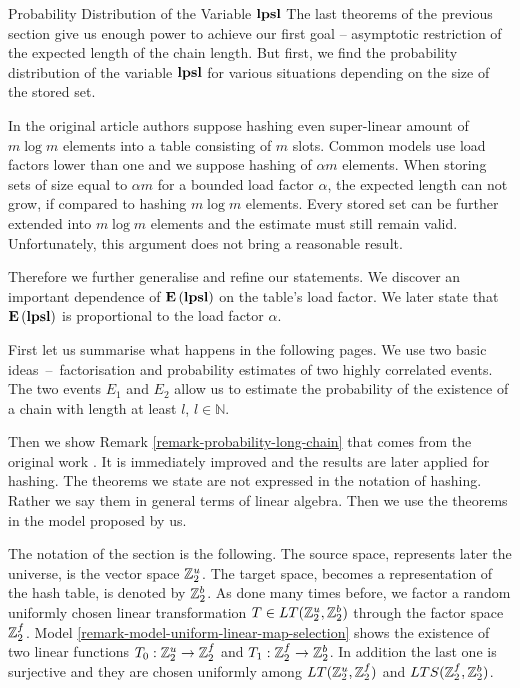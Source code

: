 \begin{section}{Probability Distribution of the Variable \texorpdfstring{$\mathbf{lpsl}$}{lpsl}}
\label{section-linear-transformations-distribution}
The last theorems of the previous section give us enough power to achieve our first goal -- asymptotic restriction of the expected length of the chain length. But first, we find the probability distribution of the variable $\mathbf{lpsl}$ for various situations depending on the size of the stored set. 

In the original article \cite{DBLP:journals/jacm/AlonDMPT99} authors suppose hashing even super-linear amount of $m \log m$ elements into a table consisting of $m$ slots. Common models use load factors lower than one and we suppose hashing of $\alpha m$ elements. When storing sets of size equal to $\alpha m$ for a bounded load factor $\alpha$, the expected length can not grow, if compared to hashing $m \log m$ elements. Every stored set can be further extended into $m \log m$ elements and the estimate must still remain valid. Unfortunately, this argument does not bring a reasonable result.

Therefore we further generalise and refine our statements. We discover an important dependence of $\mathbf{E}\left(\mathbf{lpsl}\right)$ on the table's load factor. We later state that $\mathbf{E}\left(\mathbf{lpsl}\right)$ is proportional to the load factor $\alpha$.

First let us summarise what happens in the following pages. We use two basic ideas~--~factorisation and probability estimates of two highly correlated events. The two events $E_1$ and $E_2$ allow us to estimate the probability of the existence of a chain with length at least $l$, $l \in \mathbb{N}$. 

Then we show Remark \ref{remark-probability-long-chain} that comes from the original work \cite{DBLP:journals/jacm/AlonDMPT99}. It is immediately improved and the results are later applied for hashing. The theorems we state are not expressed in the notation of hashing. Rather we say them in general terms of linear algebra. Then we use the theorems in the model proposed by us. 

The notation of the section is the following. The source space, represents later the universe, is the vector space $\mathbb{Z}_{2}^{u}$. The target space, becomes a representation of the hash table, is denoted by $\mathbb{Z}_{2}^{b}$. As done many times before, we factor a random uniformly chosen linear transformation $T \in LT(\mathbb{Z}_{2}^{u}, \mathbb{Z}_{2}^{b})$ through the factor space $\mathbb{Z}_{2}^{f}$. Model \ref{remark-model-uniform-linear-map-selection} shows the existence of two linear functions $T_0: \mathbb{Z}_{2}^{u} \rightarrow \mathbb{Z}_{2}^{f}$ and $T_1: \mathbb{Z}_{2}^{f} \rightarrow \mathbb{Z}_{2}^{b}$. In addition the last one is surjective and they are chosen uniformly among $LT(\mathbb{Z}_{2}^{u}, \mathbb{Z}_{2}^{f})$ and $LTS(\mathbb{Z}_{2}^{f}, \mathbb{Z}_{2}^{b})$.


\end{section}
